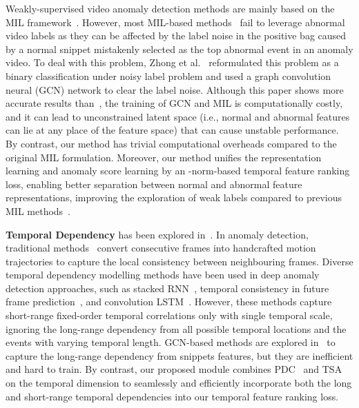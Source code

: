 \documentclass[final]{cvpr}
\begin{document}
Weakly-supervised video anomaly detection methods are mainly based on the MIL framework~\cite{sultani2018real}. However, most MIL-based methods~\cite{sultani2018real,zhu2019motion,8803657} fail to leverage abnormal video labels as they can be affected by the label noise in the positive bag caused by a normal snippet mistakenly selected as the top abnormal event in an anomaly video. 
To deal with this problem, Zhong et al.~\cite{zhong2019graph} reformulated this problem as a binary classification under noisy label problem and used a graph convolution neural (GCN) network to clear the label noise. Although this paper shows more accurate results than~\cite{sultani2018real}, the training of GCN and MIL is computationally costly, and it can lead to unconstrained latent space (i.e., normal and abnormal features can lie at any place of the feature space) that can cause unstable performance. By contrast, our method has trivial computational overheads compared to the original MIL formulation. Moreover, our method unifies the representation learning and anomaly score learning by an -norm-based temporal feature ranking loss, enabling better separation between normal and abnormal feature representations, improving the exploration of weak labels compared to previous MIL methods~\cite{sultani2018real,8803657,9102722,Wu2020not,zhu2019motion,zhong2019graph}.




\textbf{Temporal Dependency} has been explored in~\cite{liu2018future,luo2017revisit,liu2019margin,zhong2019graph,Wu2020not,kratz2009anomaly,xu2014video}. 
In anomaly detection, traditional methods~\cite{kratz2009anomaly,xu2014video} convert consecutive frames into handcrafted motion trajectories to capture the local consistency between neighbouring frames. Diverse temporal dependency modelling methods have been used in deep anomaly detection approaches, such as stacked RNN~\cite{luo2017revisit}, temporal consistency in future frame prediction~\cite{liu2018future}, and convolution LSTM~\cite{liu2019margin}.
However, these methods capture short-range fixed-order temporal correlations only with single temporal scale, ignoring the long-range dependency from all possible temporal locations and the events with varying temporal length. GCN-based methods are explored in~\cite{zhong2019graph,Wu2020not} to capture the long-range dependency from snippets features, but they are  inefficient and hard to train.
By contrast, our proposed module combines 
PDC~\cite{yu2015multi} and TSA~\cite{wang2018non} on the temporal dimension to seamlessly and efficiently incorporate both the long and short-range temporal dependencies into our temporal feature ranking loss. 
\end{document}
